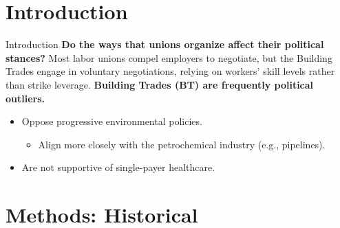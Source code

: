 \documentclass{beamer}
\begin{document}
\section*{Introduction}
\begin{frame}{Introduction}
\textbf{Do the ways that unions organize affect their political stances?}\newline\newline %
Most labor unions compel employers to negotiate, but the Building Trades engage in voluntary negotiations, relying on workers' skill levels rather than strike leverage. 
	\newline\newline
	\textbf{Building Trades (BT) are frequently political outliers.}
	\begin{itemize}
		\item Oppose progressive environmental policies.
		\begin{itemize}
			\item Align more closely with the petrochemical industry (e.g., pipelines).
		\end{itemize}
		\item Are not supportive of single-payer healthcare.
	\end{itemize}
	
\end{frame}

\section*{Methods: Historical}
\end{document}
